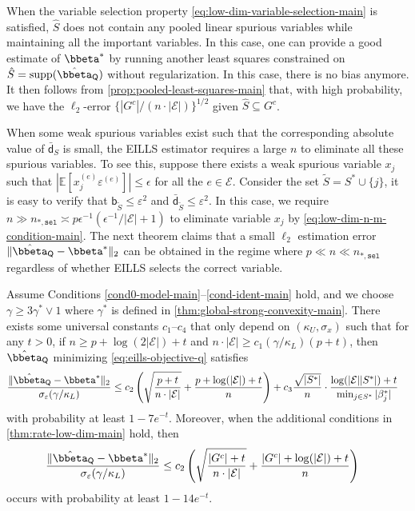 \documentclass[10pt]{article}
\numberwithin{equation}{section}
\newcommand*{\supp}{\mathrm{supp}}
\begin{document}
{When the variable selection property \eqref{eq:low-dim-variable-selection-main} is satisfied, $\hat{S}$ does not contain any pooled linear spurious variables while maintaining all the important variables. In this case, one can provide a good estimate of $\bbeta^*$ by running another least squares constrained on $\hat{S} = \supp(\hat{\bbeta}_{\mathsf{Q}})$ without regularization. In this case, there is no bias anymore. It then follows from \cref{prop:pooled-least-squares-main} that, with high probability, we have the $\ell_2$-error $\{|G^c|/(n \cdot |\mathcal{E}|)\}^{1/2}$ given $\hat{S}\subseteq G^c$. 

When some weak spurious variables exist such that the corresponding absolute value of $\bar{\mathsf{d}}_S$ is small, the EILLS estimator requires a large $n$ to eliminate all these spurious variables. To see this, suppose there exists a weak spurious variable $x_j$ such that $|\mathbb{E}[x_j^{(e)}\varepsilon^{(e)}]| \le \epsilon$ for all the $e\in \mathcal{E}$. Consider the set $\tilde{S} = S^* \cup \{j\}$, it is easy to verify that $\mathsf{b}_{\tilde{S}} \le \varepsilon^2$ and $\bar{\mathsf{d}}_{\tilde{S}} \le \varepsilon^2$. In this case, we require $n\gg n_{*,\mathtt{sel}} \asymp p\epsilon^{-1}( \epsilon^{-1}/\mathcal{|E|} + 1)$ to eliminate variable $x_j$ by \eqref{eq:low-dim-n-m-condition-main}. The next theorem claims that a small $\ell_2$ estimation error $\|\hat{\bbeta}_{\mathsf{Q}} - \bbeta^*\|_2$ can be obtained in the regime where $p \ll n \ll n_{*,\mathtt{sel}}$ regardless of whether EILLS selects the correct variable.

\begin{theorem} 
\label{thm:rate-faster-low-dim-main}
Assume Conditions \ref{cond0-model-main}--\ref{cond-ident-main} hold, and we choose $\gamma \ge 3\gamma^*\lor 1$ where $\gamma^*$ is defined in \cref{thm:global-strong-convexity-main}. There exists some universal constants $c_1$--$c_4$ that only depend on $(\kappa_U, \sigma_x)$ such that for any $t>0$, if $n \ge p + \log(2|\mathcal{E}|) + t$ and $n \cdot |\mathcal{E}| \ge c_1 (\gamma/\kappa_L)(p + t)$, then $\hat{\bbeta}_{\mathsf{Q}}$ minimizing \eqref{eq:eills-objective-q} satisfies
\begin{align}
\label{eq:low-dim-rate2}
    \frac{\|\hat{\bbeta}_{\mathsf{Q}} - \bbeta^*\|_2}{\sigma_\varepsilon (\gamma/\kappa_L)}  &\le c_2 \left(\sqrt{\frac{p+t}{n \cdot |\mathcal{E}|}} + \frac{p+\log(|\mathcal{E}|)+t}{n}\right) + c_3 \frac{\sqrt{|S^*|}}{n} \cdot \frac{\log(|\mathcal{E}||S^*|)+t}{\min_{j\in S^*}|\beta^*_j|}
\end{align} with probability at least $1-7e^{-t}$. Moreover, when the additional conditions in \cref{thm:rate-low-dim-main} hold, then
\begin{align}
\label{eq:low-dim-rate1}
    \frac{\|\hat{\bbeta}_{\mathsf{Q}} - \bbeta^*\|_2}{\sigma_\varepsilon (\gamma/\kappa_L)}  &\le c_2 \left(\sqrt{\frac{|{G}^c|+t}{n \cdot |\mathcal{E}|}} + \frac{|{G}^c|+\log(|\mathcal{E}|)+t}{n}\right)
\end{align} occurs with probability at least $1-14e^{-t}$.
\end{theorem} 


}
\end{document}
